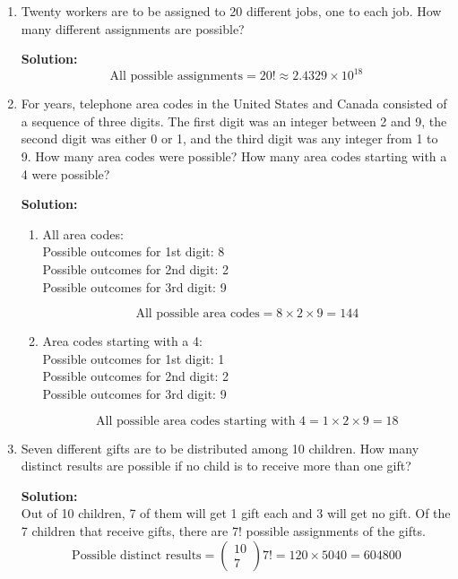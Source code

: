 \documentclass{report}
\begin{document}
\begin{enumerate}


\item Twenty workers are to be assigned to 20 different
jobs, one to each job. How many different assignments
are possible?

{\bf Solution:} 
    $$ \text{All possible assignments} =  20! \approx 2.4329 \times 10^{18} $$


\item For years, telephone area codes in the United
States and Canada consisted of a sequence of three
digits. The first digit was an integer between 2 and
9, the second digit was either 0 or 1, and the third
digit was any integer from 1 to 9. How many area
codes were possible? How many area codes starting
with a 4 were possible?

{\bf Solution:}
    \begin{enumerate}
        \item All area codes:\\
        Possible outcomes for 1st digit: 8 \\
        Possible outcomes for 2nd digit: 2 \\
        Possible outcomes for 3rd digit: 9 

        $$ \text{All possible area codes} = 8 \times 2 \times 9  = 144 $$
        \item Area codes starting with a 4:\\
        Possible outcomes for 1st digit: 1 \\
        Possible outcomes for 2nd digit: 2 \\
        Possible outcomes for 3rd digit: 9

        $$ \text{All possible area codes starting with 4} = 1 \times 2 \times 9  = 18 $$
\end{enumerate}

\item Seven different gifts are to be distributed among
10 children. How many distinct results are possible
if no child is to receive more than one gift?

{\bf Solution:} \\
    Out of 10 children, 7 of them will get 1 gift each and 3 will get no gift. Of the 7 children that receive gifts, there are 7! possible assignments of the gifts. \\
    $$ \text{Possible distinct results} = \begin{pmatrix} 
    10 \\ 7 
    \end{pmatrix}7! = 120 \times 5040 = 604800 $$


\end{enumerate}
\end{document}
